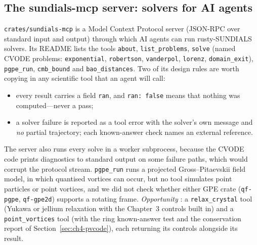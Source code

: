 \subsection{The sundials-mcp server: solvers for AI agents}
\texttt{crates/sundials-mcp} is a Model Context Protocol server (JSON-RPC over standard input and output) through
which AI agents can run rusty-SUNDIALS solvers. Its README lists the tools \texttt{about},
\texttt{list\_problems}, \texttt{solve} (named CVODE problems: \texttt{exponential}, \texttt{robertson},
\texttt{vanderpol}, \texttt{lorenz}, \texttt{domain\_exit}), \texttt{pgpe\_run}, \texttt{cmb\_bound} and
\texttt{bao\_distances}. Two of its design rules are worth copying in any scientific tool that an agent will call:
\begin{itemize}
\item every result carries a field \texttt{ran}, and \texttt{ran: false} means that nothing was computed---never a
pass;
\item a solver failure is reported as a tool error with the solver's own message and \emph{no} partial trajectory;
each known-answer check names an external reference.
\end{itemize}
The server also runs every solve in a worker subprocess, because the CVODE code prints diagnostics to standard
output on some failure paths, which would corrupt the protocol stream. \texttt{pgpe\_run} runs a projected
Gross--Pitaevskii field model, in which quantised vortices can occur, but no tool simulates point particles or
point vortices, and we did not check whether either GPE crate (\texttt{qf-pgpe}, \texttt{qf-gpe2d}) supports a
rotating frame. \emph{Opportunity} \tierC: a \texttt{relax\_crystal} tool (Yukawa or jellium relaxation with the
Chapter~3 controls built in) and a \texttt{point\_vortices} tool (with the ring known-answer test and the
conservation report of Section~\ref{sec:ch4-pvcode}), each returning its controls alongside its result.

